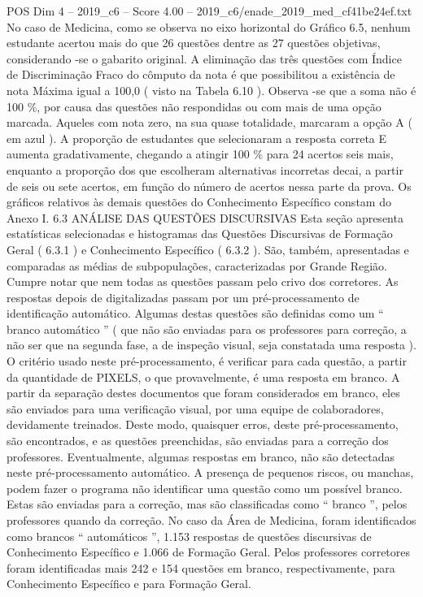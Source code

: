 \begin{textsample}{POS Dim 4 – 2019\_c6 – Score 4.00 – 2019\_c6/enade\_2019\_med\_cf41be24ef.txt}
No caso de Medicina, como se observa no eixo horizontal do Gráfico 6.5, nenhum estudante acertou mais do que 26 questões dentre as 27 questões objetivas, considerando -se o gabarito original.
A eliminação das três questões com Índice de Discriminação Fraco do cômputo da nota é que possibilitou a existência de nota Máxima igual a 100,0 ( visto na Tabela 6.10 ).
Observa -se que a soma não é 100 \%, por causa das questões não respondidas ou com mais de uma opção marcada.
Aqueles com nota zero, na sua quase totalidade, marcaram a opção A ( em azul ).
A proporção de estudantes que selecionaram a resposta correta E aumenta gradativamente, chegando a atingir 100 \% para 24 acertos seis mais, enquanto a proporção dos que escolheram alternativas incorretas decai, a partir de seis ou sete acertos, em função do número de acertos nessa parte da prova.
Os gráficos relativos às demais questões do Conhecimento Específico constam do Anexo I. 6.3 ANÁLISE DAS QUESTÕES DISCURSIVAS Esta seção apresenta estatísticas selecionadas e histogramas das Questões Discursivas de Formação Geral ( 6.3.1 ) e Conhecimento Específico ( 6.3.2 ).
São, também, apresentadas e comparadas as médias de subpopulações, caracterizadas por Grande Região.
Cumpre notar que nem todas as questões passam pelo crivo dos corretores.
As respostas depois de digitalizadas passam por um pré-processamento de identificação automático.
Algumas destas questões são definidas como um “ branco automático ” ( que não são enviadas para os professores para correção, a não ser que na segunda fase, a de inspeção visual, seja constatada uma resposta ).
O critério usado neste pré-processamento, é verificar para cada questão, a partir da quantidade de PIXELS, o que provavelmente, é uma resposta em branco.
A partir da separação destes documentos que foram considerados em branco, eles são enviados para uma verificação visual, por uma equipe de colaboradores, devidamente treinados.
Deste modo, quaisquer erros, deste pré-processamento, são encontrados, e as questões preenchidas, são enviadas para a correção dos professores.
Eventualmente, algumas respostas em branco, não são detectadas neste pré-processamento automático.
A presença de pequenos riscos, ou manchas, podem fazer o programa não identificar uma questão como um possível branco.
Estas são enviadas para a correção, mas são classificadas como “ branco ”, pelos professores quando da correção.
No caso da Área de Medicina, foram identificados como brancos “ automáticos ”, 1.153 respostas de questões discursivas de Conhecimento Específico e 1.066 de Formação Geral.
Pelos professores corretores foram identificadas mais 242 e 154 questões em branco, respectivamente, para Conhecimento Específico e para Formação Geral.

\end{textsample}
